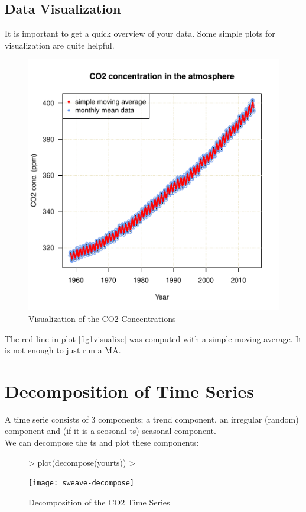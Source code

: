 \documentclass[11pt, a4paper]{article} %
\begin{document}
\subsection{Data Visualization}%
It is important to get a quick overview of your data. Some simple plots for visualization are quite helpful.
\begin{figure}
\centering
\includegraphics{sweave-fig1visualize}
\caption{Visualization of the CO2 Concentrations}
\end{figure}

The red line in plot \ref{fig1visualize} was computed with a simple moving average. It is not enough to just run a MA.

\section{Decomposition of Time Series}%
A time serie consists of 3 components; a trend component, an irregular (random) component and (if it is a seosonal ts) seasonal component.\\
We can decompose the ts and plot these components:

\begin{figure}
\centering
\begin{Schunk}
\begin{Sinput}
> plot(decompose(yourts)) 
> 
\end{Sinput}
\end{Schunk}
\texttt{[image: sweave-decompose]}
\caption{Decomposition of the CO2 Time Series}
\end{figure}
\end{document}
